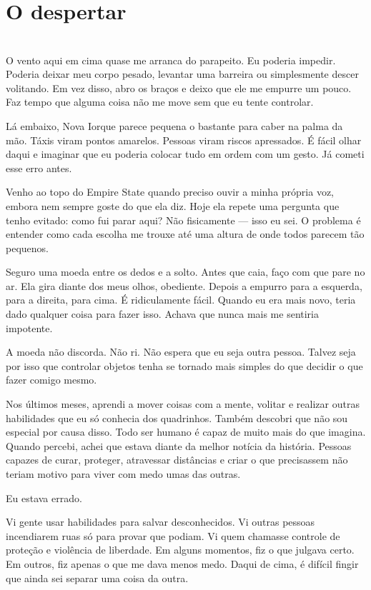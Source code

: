 
\ifdefined\useChapters
\chapter{O despertar}
\else
\chapter{}
\fi

O vento aqui em cima quase me arranca do parapeito. Eu poderia impedir. Poderia deixar meu corpo pesado, levantar uma barreira ou simplesmente descer volitando. Em vez disso, abro os braços e deixo que ele me empurre um pouco. Faz tempo que alguma coisa não me move sem que eu tente controlar.

Lá embaixo, Nova Iorque parece pequena o bastante para caber na palma da mão. Táxis viram pontos amarelos. Pessoas viram riscos apressados. É fácil olhar daqui e imaginar que eu poderia colocar tudo em ordem com um gesto. Já cometi esse erro antes.

Venho ao topo do Empire State quando preciso ouvir a minha própria voz, embora nem sempre goste do que ela diz. Hoje ela repete uma pergunta que tenho evitado: como fui parar aqui? Não fisicamente — isso eu sei. O problema é entender como cada escolha me trouxe até uma altura de onde todos parecem tão pequenos.

Seguro uma moeda entre os dedos e a solto. Antes que caia, faço com que pare no ar. Ela gira diante dos meus olhos, obediente. Depois a empurro para a esquerda, para a direita, para cima. É ridiculamente fácil. Quando eu era mais novo, teria dado qualquer coisa para fazer isso. Achava que nunca mais me sentiria impotente.

A moeda não discorda. Não ri. Não espera que eu seja outra pessoa. Talvez seja por isso que controlar objetos tenha se tornado mais simples do que decidir o que fazer comigo mesmo.

Nos últimos meses, aprendi a mover coisas com a mente, volitar e realizar outras habilidades que eu só conhecia dos quadrinhos. Também descobri que não sou especial por causa disso. Todo ser humano é capaz de muito mais do que imagina. Quando percebi, achei que estava diante da melhor notícia da história. Pessoas capazes de curar, proteger, atravessar distâncias e criar o que precisassem não teriam motivo para viver com medo umas das outras.

Eu estava errado.

Vi gente usar habilidades para salvar desconhecidos. Vi outras pessoas incendiarem ruas só para provar que podiam. Vi quem chamasse controle de proteção e violência de liberdade. Em alguns momentos, fiz o que julgava certo. Em outros, fiz apenas o que me dava menos medo. Daqui de cima, é difícil fingir que ainda sei separar uma coisa da outra.


